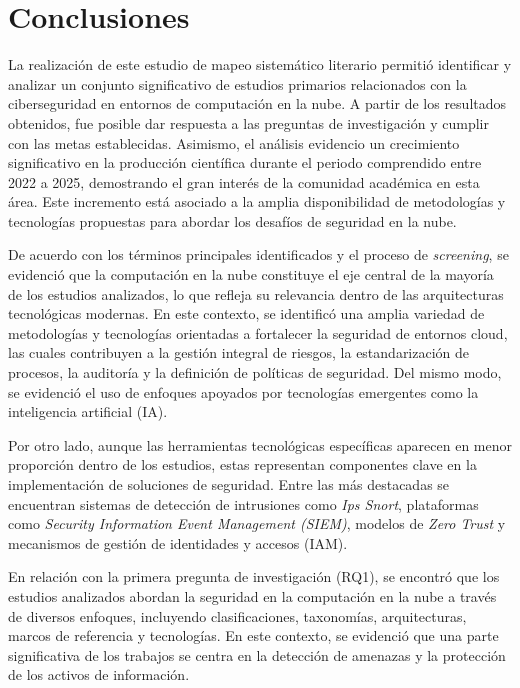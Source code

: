 \section{Conclusiones}\label{sec:conclusiones}

La realización de este estudio de mapeo sistemático literario permitió identificar y analizar un conjunto significativo 
de estudios primarios relacionados con la ciberseguridad en entornos de computación en la nube. A partir de los resultados obtenidos, 
fue posible dar respuesta a las preguntas de investigación y cumplir con las metas establecidas. Asimismo, el análisis evidencio un 
crecimiento significativo en la producción científica durante el periodo comprendido entre 2022 a 2025, demostrando el gran interés 
de la comunidad académica en esta área. Este incremento está asociado a la amplia disponibilidad de metodologías y tecnologías propuestas 
para abordar los desafíos de seguridad en la nube.

De acuerdo con los términos principales identificados y el proceso de \textit{screening}, se evidenció que la computación en la nube 
constituye el eje central de la mayoría de los estudios analizados, lo que refleja su relevancia dentro de las arquitecturas 
tecnológicas modernas. En este contexto, se identificó una amplia variedad de metodologías y tecnologías orientadas a fortalecer la 
seguridad de entornos cloud, las cuales contribuyen a la gestión integral de riesgos, la estandarización de procesos, la auditoría y 
la definición de políticas de seguridad. Del mismo modo, se evidenció el uso de enfoques apoyados por tecnologías emergentes como la 
inteligencia artificial (IA).

Por otro lado, aunque las herramientas tecnológicas específicas aparecen en menor proporción dentro de los estudios, estas 
representan componentes clave en la implementación de soluciones de seguridad. Entre las más destacadas se encuentran sistemas de 
detección de intrusiones como \textit{Ips Snort}, plataformas como \textit{Security Information Event Management (SIEM)}, modelos 
de \textit{Zero Trust} y mecanismos de gestión de identidades y accesos (IAM).

En relación con la primera pregunta de investigación (RQ1), se encontró que los estudios analizados abordan la seguridad en la 
computación en la nube a través de diversos enfoques, incluyendo clasificaciones, taxonomías, arquitecturas, marcos de referencia y 
tecnologías. En este contexto, se evidenció que una parte significativa de los trabajos se centra en la detección de amenazas y 
la protección de los activos de información.

